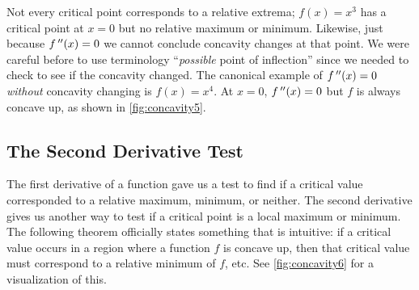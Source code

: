 Not every critical point corresponds to a relative extrema; $f(x)=x^3$ has a critical point at $x=0$ but no relative maximum or minimum. Likewise, just because $f\,''(x)=0$ we cannot conclude concavity changes at that point. We were careful before to use terminology ``\emph{possible} point of inflection'' since we needed to check to see if the concavity changed. The canonical example of $f\,''(x)=0$ \emph{without} concavity changing is $f(x)=x^4$. At $x=0$, $f\,''(x)=0$ but $f$ is always concave up, as shown in \autoref{fig:concavity5}.



\subsection{The Second Derivative Test}

The first derivative of a function gave us a test to find if a critical value corresponded to a relative maximum, minimum, or neither. The second derivative gives us another way to test if a critical point is a local maximum or minimum. The following theorem officially states something that is intuitive: if a critical value occurs in a region where a function $f$ is concave up, then that critical value must correspond to a relative minimum of $f$, etc. See \autoref{fig:concavity6} for a visualization of this.

